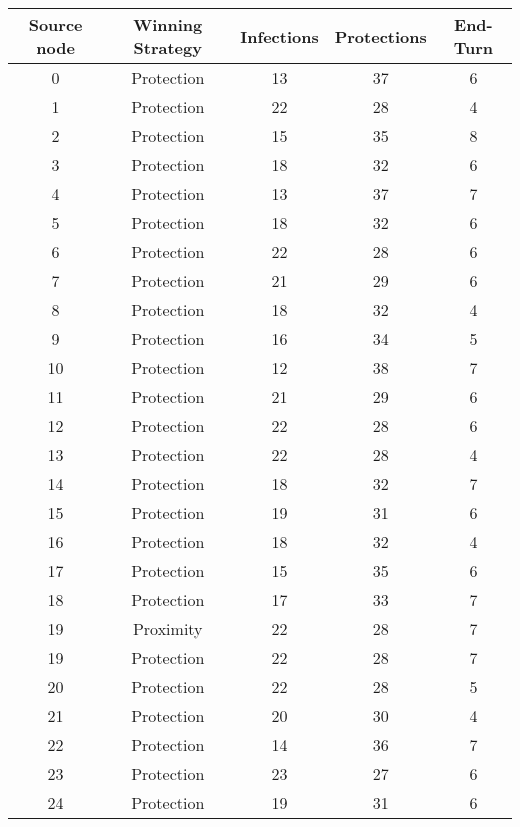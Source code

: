 \documentclass[results.tex]{subfiles}
\begin{document}
\begin{center}
  \begin{tabular}{| c || c | c | c | c |}
    \hline
    {\bfseries Source node} & {\bfseries Winning Strategy} & {\bfseries Infections} & {\bfseries Protections} & {\bfseries End-Turn} \\  %
    \hline\hline
    0 & Protection & 13 & 37 & 6 \\ 
    \hline
    1 & Protection & 22 & 28 & 4 \\ 
    \hline
    2 & Protection & 15 & 35 & 8 \\ 
    \hline
    3 & Protection & 18 & 32 & 6 \\ 
    \hline
    4 & Protection & 13 & 37 & 7 \\ 
    \hline
    5 & Protection & 18 & 32 & 6 \\ 
    \hline
    6 & Protection & 22 & 28 & 6 \\ 
    \hline
    7 & Protection & 21 & 29 & 6 \\ 
    \hline
    8 & Protection & 18 & 32 & 4 \\ 
    \hline
    9 & Protection & 16 & 34 & 5 \\ 
    \hline
    10 & Protection & 12 & 38 & 7 \\ 
    \hline
    11 & Protection & 21 & 29 & 6 \\ 
    \hline
    12 & Protection & 22 & 28 & 6 \\ 
    \hline
    13 & Protection & 22 & 28 & 4 \\ 
    \hline
    14 & Protection & 18 & 32 & 7 \\ 
    \hline
    15 & Protection & 19 & 31 & 6 \\ 
    \hline
    16 & Protection & 18 & 32 & 4 \\ 
    \hline
    17 & Protection & 15 & 35 & 6 \\ 
    \hline
    18 & Protection & 17 & 33 & 7 \\ 
    \hline
    19 & Proximity & 22 & 28 & 7 \\ 
    \hline
    19 & Protection & 22 & 28 & 7 \\ 
    \hline
    20 & Protection & 22 & 28 & 5 \\ 
    \hline
    21 & Protection & 20 & 30 & 4 \\ 
    \hline
    22 & Protection & 14 & 36 & 7 \\ 
    \hline
    23 & Protection & 23 & 27 & 6 \\ 
    \hline
    24 & Protection & 19 & 31 & 6 \\ 

\end{tabular}
\end{center}
\end{document}
